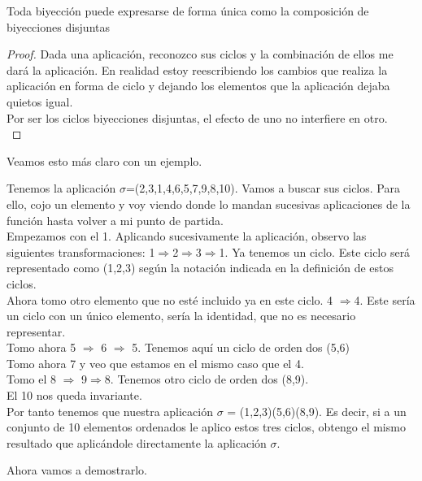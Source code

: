 \documentclass{apuntes}
\begin{document}
\begin{theorem}
 Toda biyección puede expresarse de forma única como la composición de biyecciones disjuntas
\end{theorem}
\begin{proof}
 Dada una aplicación, reconozco sus ciclos y la combinación de ellos me dará la aplicación. En realidad estoy reescribiendo los
 cambios que realiza la aplicación en forma de ciclo y dejando los elementos que la aplicación dejaba quietos igual. \\
 Por ser los ciclos biyecciones disjuntas, el efecto de uno no interfiere en otro.\\
\end{proof}
Veamos esto más claro con un ejemplo.
\begin{example}
 Tenemos la aplicación $\sigma$=(2,3,1,4,6,5,7,9,8,10). Vamos a buscar sus ciclos. Para ello, cojo un elemento y voy viendo donde
 lo mandan sucesivas aplicaciones de la función hasta volver a mi punto de partida.\\
 Empezamos con el 1. Aplicando sucesivamente la aplicación, observo las siguientes transformaciones: 1$\Rightarrow$2$\Rightarrow$3$\Rightarrow$1. Ya
 tenemos un ciclo. Este ciclo será representado como (1,2,3) según la notación indicada en la definición de estos ciclos.\\
 Ahora tomo otro elemento que no esté incluido ya en este ciclo. 4 $\Rightarrow$4. Este sería un ciclo con un único elemento, sería
 la identidad, que no es necesario representar.\\
 Tomo ahora 5 $\Rightarrow$ 6 $\Rightarrow$ 5. Tenemos aquí un ciclo de orden dos (5,6)\\
 Tomo ahora 7 y veo que estamos en el mismo caso que el 4.\\
 Tomo el 8 $\Rightarrow$ 9$\Rightarrow$8. Tenemos otro ciclo de orden dos (8,9).\\
 El 10 nos queda invariante.\\
 Por tanto tenemos que nuestra aplicación $\sigma$ = (1,2,3)(5,6)(8,9). Es decir, si a un conjunto de 10 elementos ordenados le aplico
 estos tres ciclos, obtengo el mismo resultado que aplicándole directamente la aplicación $\sigma$.
\end{example}

Ahora vamos a demostrarlo.
\end{document}
